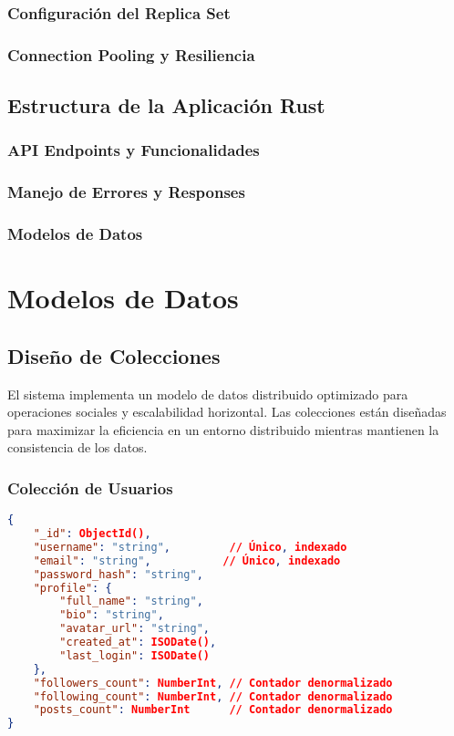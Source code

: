 \documentclass[12pt,letterpaper]{article}
\begin{document}
\subsubsection{Configuración del Replica Set}
\subsubsection{Connection Pooling y Resiliencia}

\subsection{Estructura de la Aplicación Rust}
\subsubsection{API Endpoints y Funcionalidades}
\subsubsection{Manejo de Errores y Responses}
\subsubsection{Modelos de Datos}

\section{Modelos de Datos}
\subsection{Diseño de Colecciones}
El sistema implementa un modelo de datos distribuido optimizado para operaciones sociales y escalabilidad horizontal. Las colecciones están diseñadas para maximizar la eficiencia en un entorno distribuido mientras mantienen la consistencia de los datos.

\subsubsection{Colección de Usuarios}
\begin{lstlisting}[language=json]
{
    "_id": ObjectId(),
    "username": "string",         // Único, indexado
    "email": "string",           // Único, indexado
    "password_hash": "string",
    "profile": {
        "full_name": "string",
        "bio": "string",
        "avatar_url": "string",
        "created_at": ISODate(),
        "last_login": ISODate()
    },
    "followers_count": NumberInt, // Contador denormalizado
    "following_count": NumberInt, // Contador denormalizado
    "posts_count": NumberInt      // Contador denormalizado
}
\end{lstlisting}
\end{document}
